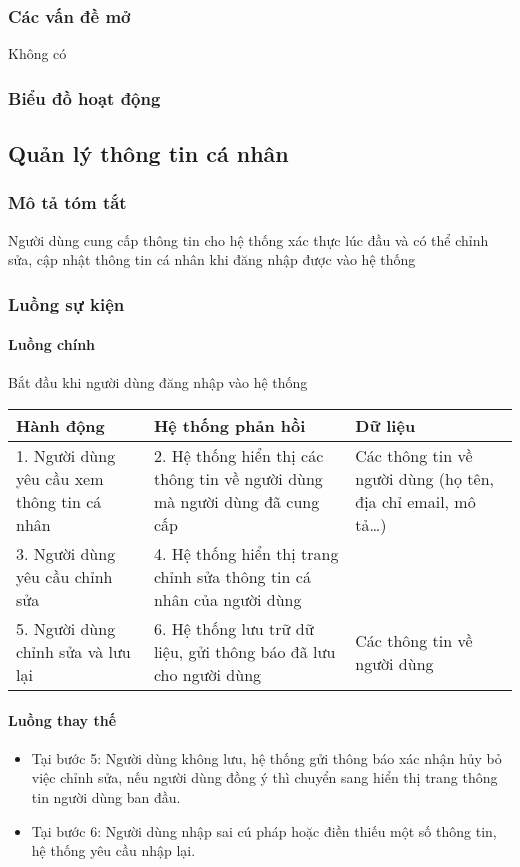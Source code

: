 \documentclass[./../main_file.tex]{subfiles}
\begin{document}
	\subsubsection{Các vấn đề mở}
	Không có
	
	\subsubsection{Biểu đồ hoạt động}

\subsection{Quản lý thông tin cá nhân}
\subsubsection{Mô tả tóm tắt}
Người dùng cung cấp thông tin cho hệ thống xác thực lúc đầu và có thể chỉnh sửa, cập nhật thông tin cá nhân khi đăng nhập được vào hệ thống
\subsubsection{Luồng sự kiện}
\paragraph{Luồng chính}
Bắt đầu khi người dùng đăng nhập vào hệ thống
\begin{longtable}{|p{}|p{}|p{}|}
		\hline
		\textbf{Hành động}                 & \textbf{Hệ thống phản hồi}                                            & \textbf{Dữ liệu}            \\ \hline
		1. Người dùng yêu cầu xem thông tin cá nhân &
		2. Hệ thống hiển thị các thông tin về người dùng mà người dùng đã cung cấp &
		Các thông tin về người dùng (họ tên, địa chỉ email, mô tả…) \\ \hline
		3. Người dùng yêu cầu chỉnh sửa    & 4. Hệ thống hiển thị trang chỉnh sửa thông tin cá nhân của người dùng &                             \\ \hline
		5. Người dùng chỉnh sửa và lưu lại & 6. Hệ thống lưu trữ dữ liệu, gửi thông báo đã lưu cho người dùng      & Các thông tin về người dùng \\ \hline
\end{longtable}
\paragraph{Luồng thay thế}
\begin{itemize}
	\item Tại bước 5: Người dùng không lưu, hệ thống gửi thông báo xác nhận hủy bỏ việc chỉnh sửa, nếu người dùng đồng ý thì chuyển sang hiển thị trang thông tin người dùng ban đầu.
	\item Tại bước 6: Người dùng nhập sai cú pháp hoặc điền thiếu một số thông tin, hệ thống yêu cầu nhập lại.
	
\end{itemize}
\end{document}
